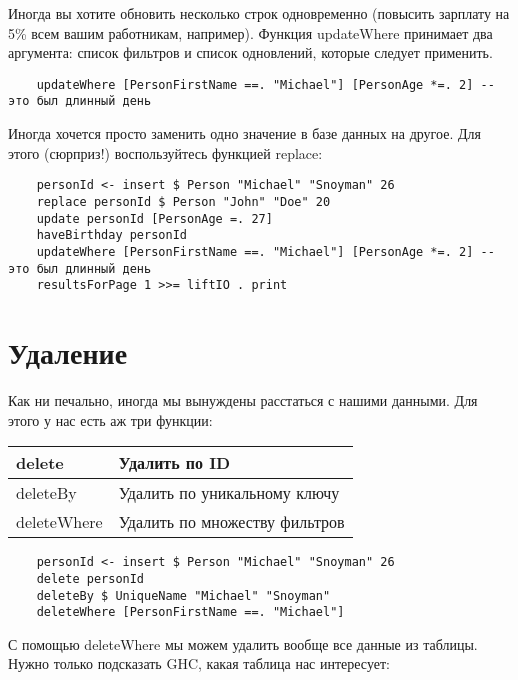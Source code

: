 Иногда вы хотите обновить несколько строк одновременно (повысить зарплату на 5\% всем вашим работникам, например). Функция updateWhere принимает два аргумента: список фильтров и список одновлений, которые следует применить. %

\begin{lstlisting}
    updateWhere [PersonFirstName ==. "Michael"] [PersonAge *=. 2] -- это был длинный день
\end{lstlisting}

Иногда хочется просто заменить одно значение в базе данных на другое. Для этого (сюрприз!) воспользуйтесь функцией replace:

\begin{lstlisting}
    personId <- insert $ Person "Michael" "Snoyman" 26
    replace personId $ Person "John" "Doe" 20
    update personId [PersonAge =. 27]
    haveBirthday personId
    updateWhere [PersonFirstName ==. "Michael"] [PersonAge *=. 2] -- это был длинный день
    resultsForPage 1 >>= liftIO . print
\end{lstlisting}%

\section{Удаление} %

Как ни печально, иногда мы вынуждены расстаться с нашими данными. Для этого у нас есть аж три функции:

\begin{center}
\begin{tabular}{ | l | l |}
\hline
delete & Удалить по ID \\ \hline
deleteBy & Удалить по уникальному ключу \\ \hline
deleteWhere & Удалить по множеству фильтров \\ \hline
\end{tabular}
\end{center}

\begin{lstlisting}
    personId <- insert $ Person "Michael" "Snoyman" 26
    delete personId
    deleteBy $ UniqueName "Michael" "Snoyman"
    deleteWhere [PersonFirstName ==. "Michael"]
\end{lstlisting}%

С помощью deleteWhere мы можем удалить вообще все данные из таблицы. Нужно только подсказать GHC, какая таблица нас интересует:

